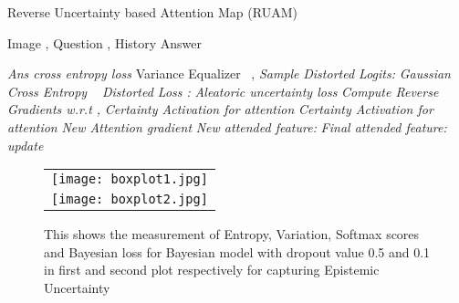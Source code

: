 \documentclass[review]{elsarticle}
\begin{document}
\begin{algorithm}[!htb]
	\caption{Reverse Uncertainty based Attention Map (RUAM) }\label{alg:GCA}
	\begin{algorithmic}[1]
  Image , Question , History 
		  Answer       
		\State  {}
		\State  {}
		\State  {}
		
		\State  
		\State  \textit{Ans cross entropy  loss}
		\State Variance Equalizer~\cite{dorman_github2014}  , 
\While{}
		\State \textit{Sample  }
		\State \textit{Distorted Logits:}
		\State \textit{Gaussian Cross Entropy ~\cite{dorman_github2014} } 
		\State \textit{Distorted Loss :}
		\State \textit{Aleatoric uncertainty loss }
		\EndWhile
		\State \textit{Compute Reverse Gradients w.r.t , }
		\State \textit{Certainty Activation  for attention }
		\State \textit{Certainty Activation  for attention }
		\State \textit{New Attention gradient }
		\State \textit{New attended feature: }
		\State \textit{Final attended feature: }
		\State  \textit{update } 
		\EndWhile
		\EndProcedure
	\end{algorithmic}
\end{algorithm}










































\begin{figure}[ht]
\centering
	\begin{tabular}[b]{ c}
\texttt{[image: boxplot1.jpg]}\\
\texttt{[image: boxplot2.jpg]}
	\end{tabular}
	\vspace{-1em}
	\caption{This shows the measurement of Entropy, Variation, Softmax scores and Bayesian loss for Bayesian model with dropout value 0.5 and 0.1 in first and second plot respectively for capturing Epistemic Uncertainty}
\label{fig:result_1_A}
\end{figure}
\end{document}
